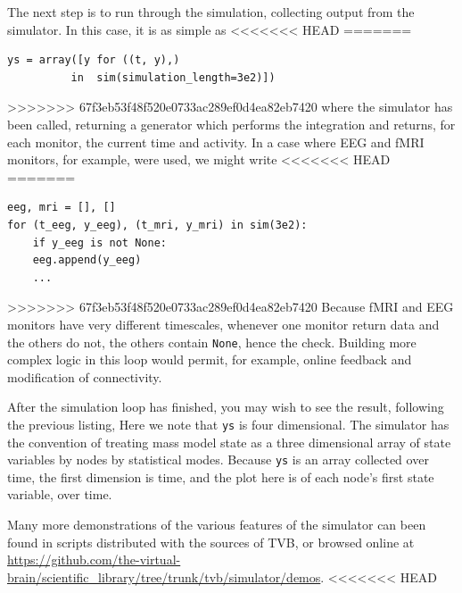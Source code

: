 The next step is to run through the simulation, collecting
output from the simulator. In this case, it is as simple as
<<<<<<< HEAD
=======
\begin{lstlisting}
ys = array([y for ((t, y),) 
          in  sim(simulation_length=3e2)])
\end{lstlisting}
>>>>>>> 67f3eb53f48f520e0733ac289ef0d4ea82eb7420
\noindent where the simulator has been called, returning a 
generator which performs the integration and returns, for each
monitor, the current time and activity. In a case where EEG 
and fMRI monitors, for example, were used, we might write
<<<<<<< HEAD
=======
\begin{lstlisting}
eeg, mri = [], []
for (t_eeg, y_eeg), (t_mri, y_mri) in sim(3e2):
    if y_eeg is not None:
    eeg.append(y_eeg)
    ...
\end{lstlisting}
>>>>>>> 67f3eb53f48f520e0733ac289ef0d4ea82eb7420
\noindent Because fMRI and EEG monitors have very different
timescales, whenever one monitor return data and the others do
not, the others contain \texttt{None}, hence the check. Building
more complex logic in this loop would permit, for example, online
feedback and modification of connectivity. 

After the simulation loop has finished, you may wish to see the
result, following the previous listing, 
\noindent Here we note that \texttt{ys} is four dimensional. The 
simulator has the convention of treating  mass model state as a
three dimensional array of state variables by nodes by statistical
modes. Because \texttt{ys} is an array collected over time, the first
dimension is time, and the plot here is of each node's first state
variable, over time.

Many more demonstrations of the various features of the simulator
can been found in scripts distributed with the sources of TVB, or 
browsed online at \url{https://github.com/the-virtual-brain/scientific_library/tree/trunk/tvb/simulator/demos}.
<<<<<<< HEAD


